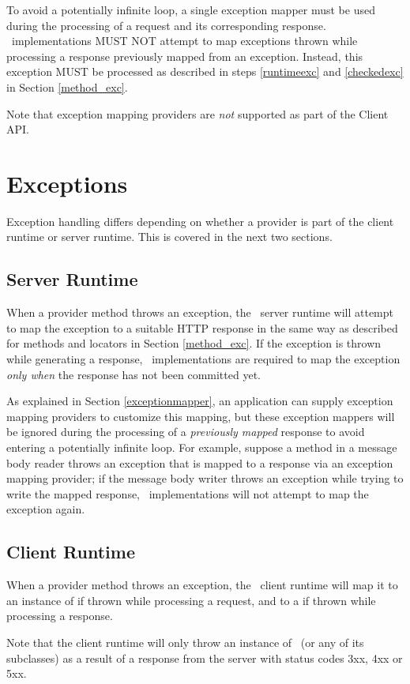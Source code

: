 To avoid a potentially infinite loop, a single exception mapper must be used during the processing of a request and its corresponding response. \jaxrs\ implementations MUST NOT attempt to map exceptions thrown while processing a response previously mapped from an exception. Instead, this exception MUST be processed as described in steps \ref{runtimeexc} and \ref{checkedexc} in Section \ref{method_exc}.

Note that exception mapping providers are {\em not} supported as part of the Client API.

\section{Exceptions}
\label{exceptions_providers}

Exception handling differs depending on whether a provider is part of the client runtime or server runtime. This is covered in the next two sections.

\subsection{Server Runtime}
\label{exceptions_providers_server}

When a provider method throws an exception, the \jaxrs\ server runtime will attempt to map the exception to a suitable HTTP response in the same way as described for methods and locators in Section \ref{method_exc}. If the exception is thrown
while generating a response, \jaxrs\ implementations are required to map the exception {\em only when} the response has not been committed yet.

As explained in Section \ref{exceptionmapper}, an application can supply exception mapping providers to customize this mapping, but these exception mappers will be ignored during the processing of a {\em previously mapped} response to avoid entering a potentially infinite loop. For example, suppose a method in a message body reader throws an exception that is mapped to a response via an exception mapping provider; if the message body writer throws an exception while trying to write the mapped response, \jaxrs\ implementations will not attempt to map the exception again.

\subsection{Client Runtime}
\label{exceptions_providers_client}

When a provider method throws an exception, the \jaxrs\ client runtime will map it to an instance of  if thrown while processing a request, and to a  if thrown while processing a response. 

Note that the client runtime will only throw an instance of \WebApplicationException\ (or any of its subclasses) as a result of a response from the server with status codes 3xx, 4xx or 5xx.

